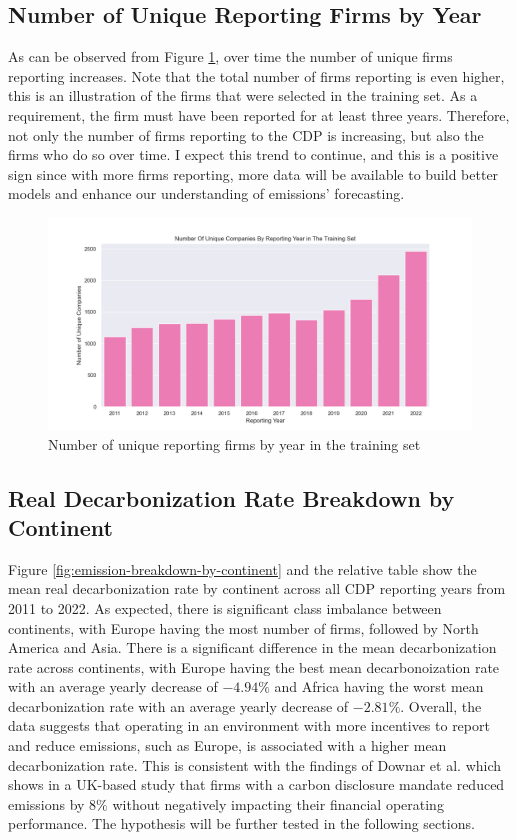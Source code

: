\subsection{Number of Unique Reporting Firms by Year}
As can be observed from Figure \ref{fig:unique-companies-by-year}, over time the number of unique firms reporting increases. Note that the total number of firms reporting is even higher, this is an illustration of the firms that were selected in the training set. As a requirement, the firm must have been reported for at least three years. Therefore, not only the number of firms reporting to the CDP is increasing, but also the firms who do so over time. I expect this trend to continue, and this is a positive sign since with more firms reporting, more data will be available to build better models and enhance our understanding of emissions' forecasting.
\begin{figure}[H]
  \begin{center}
  \includegraphics[width=5in]{figures/unique_companies.png}
  \caption{Number of unique reporting firms by year in the training set}
  \label{fig:unique-companies-by-year}
  \end{center}
\end{figure}

\subsection{Real Decarbonization Rate Breakdown by Continent}
Figure \ref{fig:emission-breakdown-by-continent} and the relative table show the mean real decarbonization rate by continent across all CDP reporting years from 2011 to 2022. As expected, there is significant class imbalance between continents, with Europe having the most number of firms, followed by North America and Asia. There is a significant difference in the mean decarbonization rate across continents, with Europe having the best mean decarbonoization rate with an average yearly decrease of $-4.94 \%$ and Africa having the worst mean decarbonization rate with an average yearly decrease of $-2.81 \%$. Overall, the data suggests that operating in an environment with more incentives to report and reduce emissions, such as Europe, is associated with a higher mean decarbonization rate. This is consistent with the findings of Downar et al.  \cite{Downar2020The} which shows in a UK-based study that firms with a carbon disclosure mandate reduced emissions by $8\%$ without negatively impacting their financial operating performance. The hypothesis will be further tested in the following sections.

